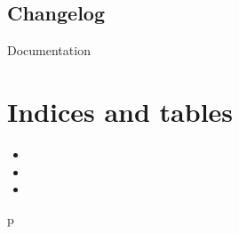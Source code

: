 \documentclass[letterpaper,10pt,english]{sphinxmanual}
\begin{document}
\section{Changelog}
\label{\detokenize{changelog::doc}}\label{\detokenize{changelog:changelog}}
Documentation


\chapter{Indices and tables}
\label{\detokenize{index:indices-and-tables}}\begin{itemize}
\item {} 

\item {} 

\item {} 

\end{itemize}


\renewcommand{\indexname}{Python Module Index}
\begin{sphinxtheindex}
\def\bigletter#1{{\Large\sffamily#1}\nopagebreak\vspace{1mm}}
\bigletter{p}
\item {}
\item {}
\end{sphinxtheindex}

\renewcommand{\indexname}{Index}
\printindex
\end{document}
